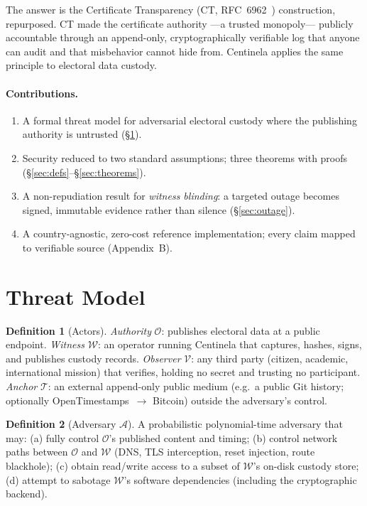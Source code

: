 \documentclass[11pt,a4paper]{article}
\theoremstyle{plain}
\theoremstyle{definition}
\newtheorem{definition}{Definition}
\theoremstyle{remark}
\newcommand{\Adv}{\mathcal{A}}
\begin{document}
The answer is the Certificate Transparency (CT, RFC~6962~\cite{rfc6962})
construction, repurposed. CT made the certificate authority ---a trusted
monopoly--- publicly accountable through an append-only, cryptographically
verifiable log that anyone can audit and that misbehavior cannot hide
from. Centinela applies the same principle to electoral data custody.

\paragraph{Contributions.}
\begin{enumerate}[leftmargin=1.4em]
  \item A formal threat model for adversarial electoral custody where
  the publishing authority is untrusted (\S\ref{sec:threat}).
  \item Security reduced to two standard assumptions; three theorems
  with proofs (\S\ref{sec:defs}--\S\ref{sec:theorems}).
  \item A non-repudiation result for \emph{witness blinding}: a targeted
  outage becomes signed, immutable evidence rather than silence
  (\S\ref{sec:outage}).
  \item A country-agnostic, zero-cost reference implementation; every
  claim mapped to verifiable source (Appendix~B).
\end{enumerate}

\section{Threat Model}
\label{sec:threat}

\begin{definition}[Actors]
\emph{Authority} $\mathcal{O}$: publishes electoral data at a public
endpoint. \emph{Witness} $\mathcal{W}$: an operator running Centinela
that captures, hashes, signs, and publishes custody records.
\emph{Observer} $\mathcal{V}$: any third party (citizen, academic,
international mission) that verifies, holding no secret and trusting no
participant. \emph{Anchor} $\mathcal{T}$: an external append-only public
medium (e.g.\ a public Git history; optionally OpenTimestamps~$\to$
Bitcoin) outside the adversary's control.
\end{definition}

\begin{definition}[Adversary $\Adv$]
A probabilistic polynomial-time adversary that may: (a) fully control
$\mathcal{O}$'s published content and timing; (b) control network paths
between $\mathcal{O}$ and $\mathcal{W}$ (DNS, TLS interception, reset
injection, route blackhole); (c) obtain read/write access to a subset of
$\mathcal{W}$'s on-disk custody store; (d) attempt to sabotage
$\mathcal{W}$'s software dependencies (including the cryptographic
backend).
\end{definition}
\end{document}
